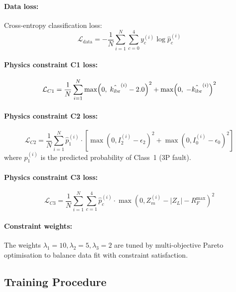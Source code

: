 \paragraph{Data loss:} Cross-entropy classification loss:
\begin{equation}
  \mathcal{L}_\mathrm{data} = -\frac{1}{N}\sum_{i=1}^{N}
    \sum_{c=0}^{4} y_c^{(i)} \log \hat{p}_c^{(i)}
  \label{eq:ch8_data_loss}
\end{equation}

\paragraph{Physics constraint C1 loss:}
\begin{equation}
  \mathcal{L}_{C1} = \frac{1}{N}\sum_{i=1}^{N}
    \max\!\left(0,\; \hat{k_{\mathrm{ibr}}}^{(i)} - 2.0\right)^2
    + \max\!\left(0,\; -\hat{k_{\mathrm{ibr}}}^{(i)}\right)^2
  \label{eq:ch8_c1_loss}
\end{equation}

\paragraph{Physics constraint C2 loss:}
\begin{equation}
  \mathcal{L}_{C2} = \frac{1}{N}\sum_{i=1}^{N}
    \hat{p}_1^{(i)} \cdot \left[\max(0, I_2^{(i)} - \epsilon_2)^2
      + \max(0, I_0^{(i)} - \epsilon_0)^2\right]
  \label{eq:ch8_c2_loss}
\end{equation}
where $\hat{p}_1^{(i)}$ is the predicted probability of Class~1 (3P fault).

\paragraph{Physics constraint C3 loss:}
\begin{equation}
  \mathcal{L}_{C3} = \frac{1}{N}\sum_{i=1}^{N}
    \sum_{c=1}^{4} \hat{p}_c^{(i)} \cdot
    \max(0, Z_m^{(i)} - |Z_L| - R_F^\mathrm{max})^2
  \label{eq:ch8_c3_loss}
\end{equation}

\paragraph{Constraint weights:}
The weights $\lambda_1 = 10, \lambda_2 = 5, \lambda_3 = 2$ are tuned
by multi-objective Pareto optimisation to balance data fit with
constraint satisfaction.

\subsection{Training Procedure}

